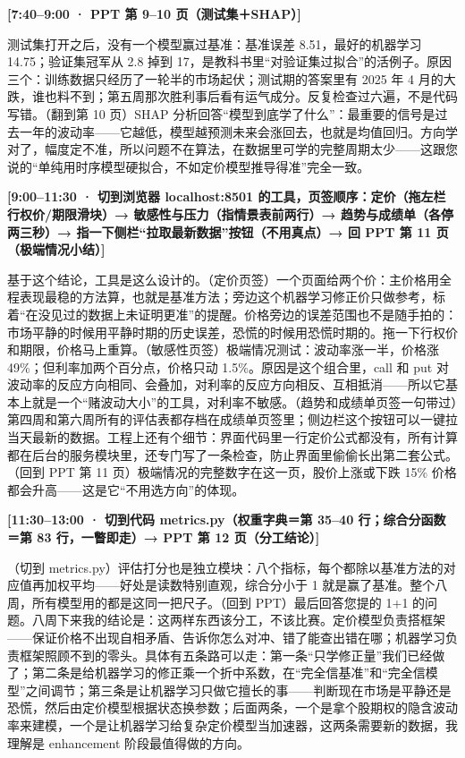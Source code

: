 \documentclass[11pt]{ctexart}
\newcommand{\cue}[1]{\noindent\colorbox{gray!15}{\parbox{\dimexpr\linewidth-2\fboxsep}{\textbf{#1}}}\par\smallskip}
\begin{document}
\cue{[7:40--9:00 · PPT 第 9--10 页（测试集＋SHAP）]}
测试集打开之后，没有一个模型赢过基准：基准误差 8.51，最好的机器学习 14.75；验证集冠军从 2.8 掉到 17，是教科书里“对验证集过拟合”的活例子。原因三个：训练数据只经历了一轮半的市场起伏；测试期的答案里有 2025 年 4 月的大跌，谁也料不到；第五周那次胜利事后看有运气成分。反复检查过六遍，不是代码写错。（翻到第 10 页）SHAP 分析回答“模型到底学了什么”：最重要的信号是过去一年的波动率——它越低，模型越预测未来会涨回去，也就是均值回归。方向学对了，幅度定不准，所以问题不在算法，在数据里可学的完整周期太少——这跟您说的“单纯用时序模型硬拟合，不如定价模型推导得准”完全一致。

\cue{[9:00--11:30 · 切到浏览器 localhost:8501 的工具，页签顺序：定价（拖左栏行权价/期限滑块）→ 敏感性与压力（指情景表前两行）→ 趋势与成绩单（各停两三秒）→ 指一下侧栏“拉取最新数据”按钮（不用真点）→ 回 PPT 第 11 页（极端情况小结）]}
基于这个结论，工具是这么设计的。（定价页签）一个页面给两个价：主价格用全程表现最稳的方法算，也就是基准方法；旁边这个机器学习修正价只做参考，标着“在没见过的数据上未证明更准”的提醒。价格旁边的误差范围也不是随手拍的：市场平静的时候用平静时期的历史误差，恐慌的时候用恐慌时期的。拖一下行权价和期限，价格马上重算。（敏感性页签）极端情况测试：波动率涨一半，价格涨 49\%；但利率加两个百分点，价格只动 1.5\%。原因是这个组合里，call 和 put 对波动率的反应方向相同、会叠加，对利率的反应方向相反、互相抵消——所以它基本上就是一个“赌波动大小”的工具，对利率不敏感。（趋势和成绩单页签一句带过）第四周和第六周所有的评估表都存档在成绩单页签里；侧边栏这个按钮可以一键拉当天最新的数据。工程上还有个细节：界面代码里一行定价公式都没有，所有计算都在后台的服务模块里，还专门写了一条检查，防止界面里偷偷长出第二套公式。（回到 PPT 第 11 页）极端情况的完整数字在这一页，股价上涨或下跌 15\% 价格都会升高——这是它“不用选方向”的体现。

\cue{[11:30--13:00 · 切到代码 metrics.py（权重字典＝第 35--40 行；综合分函数＝第 83 行，一瞥即走）→ PPT 第 12 页（分工结论）]}
（切到 metrics.py）评估打分也是独立模块：八个指标，每个都除以基准方法的对应值再加权平均——好处是读数特别直观，综合分小于 1 就是赢了基准。整个八周，所有模型用的都是这同一把尺子。（回到 PPT）最后回答您提的 1+1 的问题。八周下来我的结论是：这两样东西该分工，不该比赛。定价模型负责搭框架——保证价格不出现自相矛盾、告诉你怎么对冲、错了能查出错在哪；机器学习负责框架照顾不到的零头。具体有五条路可以走：第一条“只学修正量”我们已经做了；第二条是给机器学习的修正乘一个折中系数，在“完全信基准”和“完全信模型”之间调节；第三条是让机器学习只做它擅长的事——判断现在市场是平静还是恐慌，然后由定价模型根据状态换参数；后面两条，一个是拿个股期权的隐含波动率来建模，一个是让机器学习给复杂定价模型当加速器，这两条需要新的数据，我理解是 enhancement 阶段最值得做的方向。
\end{document}
